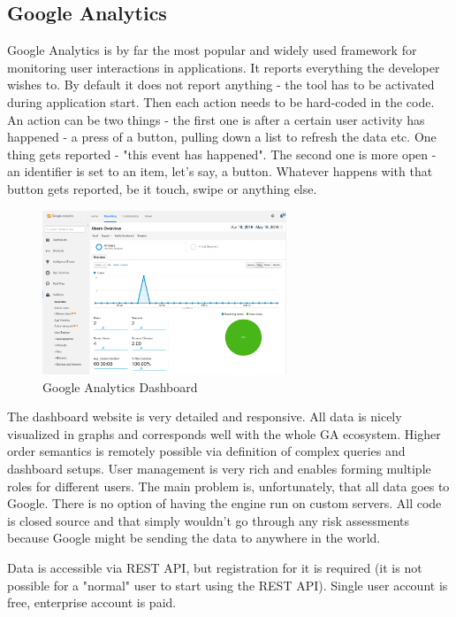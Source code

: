 \subsection{Google Analytics}

Google Analytics is by far the most popular and widely used framework for monitoring user interactions in applications. It reports everything the developer wishes to. By default it does not report anything - the tool has to be activated during application start. Then each action needs to be hard-coded in the code. An action can be two things - the first one is after a certain user activity has happened - a press of a button, pulling down a list to refresh the data etc. One thing gets reported - "this event has happened". The second one is more open - an identifier is set to an item, let's say, a button. Whatever happens with that button gets reported, be it touch, swipe or anything else.

\begin{figure}[!ht]
	\centering
	\includegraphics[width=0.65\textwidth]{figures/analytics}
    \caption{Google Analytics Dashboard}
\end{figure}

The dashboard website is very detailed and responsive. All data is nicely visualized in graphs and corresponds well with the whole GA ecosystem. Higher order semantics is remotely possible via definition of complex queries and dashboard setups. User management is very rich and enables forming multiple roles for different users. The main problem is, unfortunately, that all data goes to Google. There is no option of having the engine run on custom servers. All code is closed source and that simply wouldn't go through any risk assessments because Google might be sending the data to anywhere in the world.

Data is accessible via REST API, but registration for it is required (it is not possible for a "normal" user to start using the REST API). Single user account is free, enterprise account is paid.

